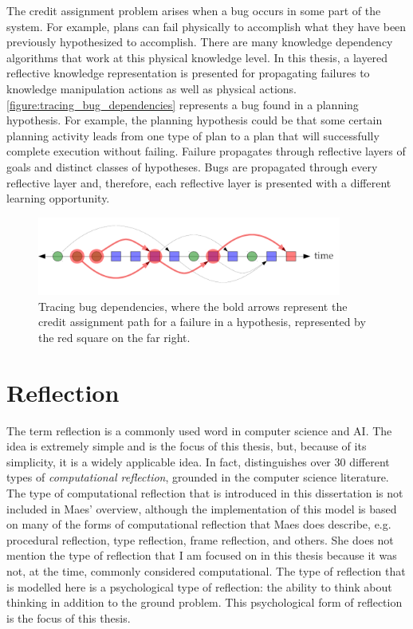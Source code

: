 The credit assignment problem arises when a bug occurs in some part of
the system.  For example, plans can fail physically to accomplish what
they have been previously hypothesized to accomplish.  There are many
knowledge dependency algorithms that work at this physical knowledge
level.  In this thesis, a layered reflective knowledge representation
is presented for propagating failures to knowledge manipulation
actions as well as physical actions.
{\mbox{\autoref{figure:tracing_bug_dependencies}}} represents a bug
found in a planning hypothesis.  For example, the planning hypothesis
could be that some certain planning activity leads from one type of
plan to a plan that will successfully complete execution without
failing.  Failure propagates through reflective layers of goals and
distinct classes of hypotheses.  Bugs are propagated through every
reflective layer and, therefore, each reflective layer is presented
with a different learning opportunity.
\begin{figure}
\center
\includegraphics[width=10cm]{gfx/tracing_bug_dependencies}
\caption[Tracing bug dependencies.]{Tracing bug dependencies, where
  the bold arrows represent the credit assignment path for a failure
  in a hypothesis, represented by the red square on the far right.}
\label{figure:tracing_bug_dependencies}
\end{figure}

\section{Reflection}

The term reflection is a commonly used word in computer science and
AI.  The idea is extremely simple and is the focus of this thesis,
but, because of its simplicity, it is a widely applicable idea.  In
fact, \cite{maes:1988} distinguishes over 30 different types of
\emph{computational reflection}, grounded in the computer science
literature.  The type of computational reflection that is introduced
in this dissertation is not included in Maes' overview, although the
implementation of this model is based on many of the forms of
computational reflection that Maes does describe, e.g. procedural
reflection, type reflection, frame reflection, and others.  She does
not mention the type of reflection that I am focused on in this thesis
because it was not, at the time, commonly considered computational.
The type of reflection that is modelled here is a psychological type
of reflection: the ability to think about thinking in addition to the
ground problem.  This psychological form of reflection is the focus of
this thesis.

